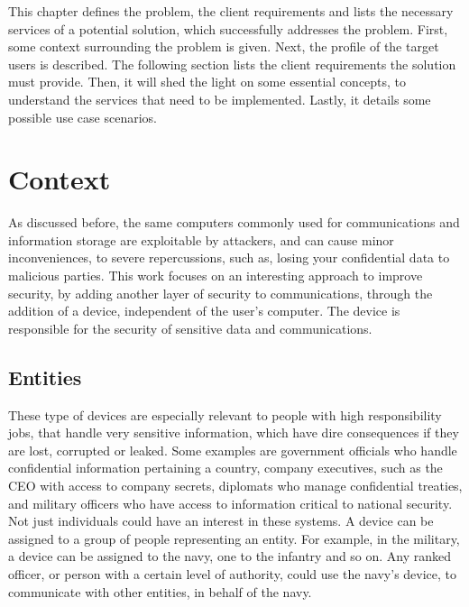 \cleardoublepage
\label{chap:problem}

This chapter defines the problem, the client requirements and lists the necessary services of a potential solution, which successfully addresses the problem.
First, some context surrounding the problem is given. Next, the profile of the target users is described. The following section lists the client requirements the solution must provide.
Then, it will shed the light on some essential concepts, to understand the services that need to be implemented. Lastly, it details some possible use case scenarios.

\section{Context}\label{chap:problem:context}

As discussed before, the same computers commonly used for communications and information storage are exploitable by attackers, and can cause minor inconveniences, to severe repercussions, such as, losing your confidential data to malicious parties.
This work focuses on an interesting approach to improve security, by adding another layer of security to communications, through the addition of a device, independent of the user's computer. The device is responsible for the security of sensitive data and communications.

\subsection{Entities}\label{chap:problem:entities}

These type of devices are especially relevant to people with high responsibility jobs, that handle very sensitive information, which have dire consequences if they are lost, corrupted or leaked.
Some examples are government officials who handle confidential information pertaining a country, company executives, such as the CEO with access to company secrets, diplomats who manage confidential treaties, and military officers who have access to information critical to national security.
Not just individuals could have an interest in these systems. A device can be assigned to a group of people representing an entity. For example, in the military, a device can be assigned to the navy, one to the infantry and so on. Any ranked officer, or person with a certain level of authority, could use the navy's device, to communicate with other entities, in behalf of the navy.

